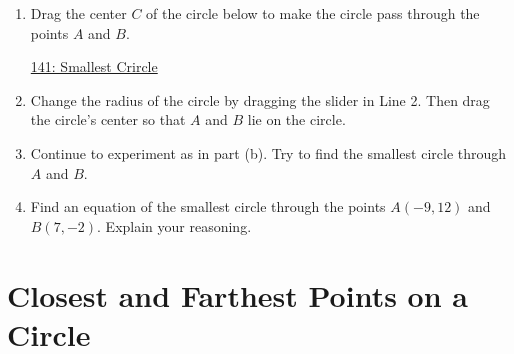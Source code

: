 \documentclass{ximera}
\begin{document}
\begin{question}  \label{QKFr3Dfer33}

\begin{enumerate}

This question is about finding an equation of the smallest circle passing through the points $A(-9,12)$ and $B(7,-2)$.

\item Drag the center $C$ of the circle below to make the circle pass through the points $A$ and $B$.

\begin{onlineOnly}
    \begin{center}
\end{center}
\end{onlineOnly}

\href{https://www.desmos.com/calculator/d3co2xy08s}{141: Smallest Crircle}

\item Change the radius of the circle by dragging the slider in Line 2. Then drag the circle's center so that $A$ and $B$ lie on the circle.

\item Continue to experiment as in part (b). Try to find the smallest circle through $A$ and $B$.

\item Find an equation of the smallest circle through the points $A(-9,12)$ and $B(7,-2)$. Explain your reasoning. 

\end{enumerate}

\end{question}


\section{Closest and Farthest Points on a Circle}
\end{document}
